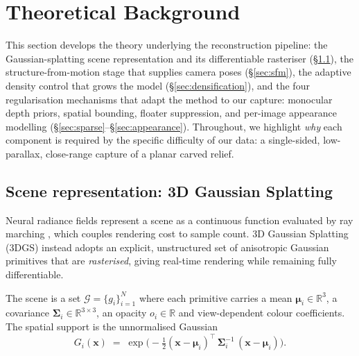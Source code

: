 %

\section{Theoretical Background}
\label{sec:theory}

This section develops the theory underlying the reconstruction pipeline: the
Gaussian-splatting scene representation and its differentiable rasteriser
(\S\ref{sec:3dgs}), the structure-from-motion stage that supplies camera poses
(\S\ref{sec:sfm}), the adaptive density control that grows the model
(\S\ref{sec:densification}), and the four regularisation mechanisms that adapt the
method to our capture: monocular depth priors, spatial bounding, floater
suppression, and per-image appearance modelling
(\S\ref{sec:sparse}--\S\ref{sec:appearance}). Throughout, we highlight
\emph{why} each component is required by the specific difficulty of our data: a
single-sided, low-parallax, close-range capture of a planar carved relief.

\subsection{Scene representation: 3D Gaussian Splatting}
\label{sec:3dgs}

Neural radiance fields represent a scene as a continuous function evaluated by
ray marching \cite{mildenhall2020nerf}, which couples rendering cost to sample
count. 3D Gaussian Splatting (3DGS) \cite{kerbl2023gaussian} instead adopts an
explicit, unstructured set of anisotropic Gaussian primitives that are
\emph{rasterised}, giving real-time rendering while remaining fully
differentiable.

The scene is a set $\mathcal{G}=\{g_i\}_{i=1}^{N}$ where each primitive carries a
mean $\bm{\mu}_i\in\mathbb{R}^3$, a covariance $\bm{\Sigma}_i\in\mathbb{R}^{3\times3}$,
an opacity $o_i\in\mathbb{R}$ and view-dependent colour coefficients. The spatial
support is the unnormalised Gaussian
\begin{equation}
  G_i(\bm{x}) \;=\; \exp\!\Big(-\tfrac{1}{2}(\bm{x}-\bm{\mu}_i)^{\!\top}\,
  \bm{\Sigma}_i^{-1}\,(\bm{x}-\bm{\mu}_i)\Big).
  \label{eq:gaussian}
\end{equation}

